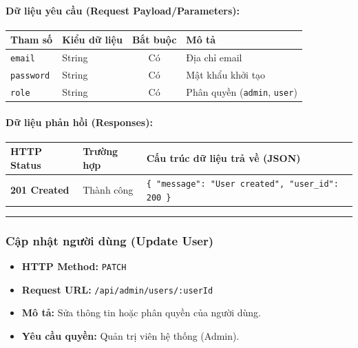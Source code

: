 \documentclass[12pt,a4paper]{article}
\begin{document}
\paragraph{Dữ liệu yêu cầu (Request Payload/Parameters):}
\begin{longtable}{|>{\raggedright\arraybackslash}p{2.8cm}|>{\raggedright\arraybackslash}p{2.2cm}|c|>{\raggedright\arraybackslash}p{7.0cm}|}
\hline
\textbf{Tham số} & \textbf{Kiểu dữ liệu} & \textbf{Bắt buộc} & \textbf{Mô tả} \\ \hline
\endhead
\texttt{email} & String & Có & Địa chỉ email \\ \hline
\texttt{password} & String & Có & Mật khẩu khởi tạo \\ \hline
\texttt{role} & String & Có & Phân quyền (\texttt{admin}, \texttt{user}) \\ \hline
\end{longtable}

\paragraph{Dữ liệu phản hồi (Responses):}
\begin{longtable}{|>{\raggedright\arraybackslash}p{2.8cm}|>{\raggedright\arraybackslash}p{3.2cm}|>{\raggedright\arraybackslash}p{8.0cm}|}
\hline
\textbf{HTTP Status} & \textbf{Trường hợp} & \textbf{Cấu trúc dữ liệu trả về (JSON)} \\ \hline
\endhead
\textbf{201 Created} & Thành công & \texttt{\{ "message": "User created", "user\_id": 200 \}} \\ \hline
\end{longtable}

\vskip 0.4cm
\noindent\rule{\textwidth}{0.3pt}
\vskip 0.4cm

\subsubsection{Cập nhật người dùng (Update User)}
\begin{itemize}[leftmargin=*]
    \item \textbf{HTTP Method:} \texttt{PATCH}
    \item \textbf{Request URL:} \texttt{/api/admin/users/:userId}
    \item \textbf{Mô tả:} Sửa thông tin hoặc phân quyền của người dùng.
    \item \textbf{Yêu cầu quyền:} Quản trị viên hệ thống (Admin).
\end{itemize}
\end{document}
